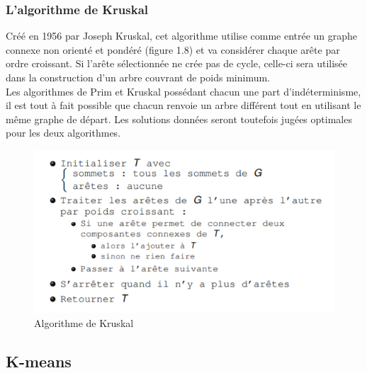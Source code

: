 \documentclass[memoire.tex]{subfiles}
\begin{document}
\subsubsection{L’algorithme de Kruskal}
Créé en 1956 par Joseph Kruskal,  cet algorithme utilise comme entrée un graphe connexe non orienté et pondéré (figure 1.8) et va considérer chaque arête par ordre croissant. Si l’arête sélectionnée ne crée pas de cycle, celle-ci sera utilisée dans la construction d’un arbre couvrant de poids minimum.\\
Les algorithmes de Prim et Kruskal possédant chacun une part d’indéterminisme, il est tout à fait possible que chacun renvoie un arbre différent tout en utilisant le même graphe de départ. Les solutions données seront toutefois jugées optimales pour les deux algorithmes.
	\begin{figure}[h!]
		\centerline{\includegraphics[scale=0.8]{img/kruskal.png}}
		\caption{Algorithme de Kruskal}
	\end{figure}
\newpage
\subsection{K-means}
\end{document}
